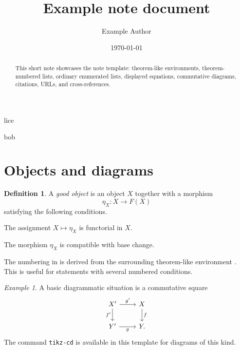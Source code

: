 \documentclass[12pt,a4paper]{amsart}
\title{Example note document}
\author{Example Author}
\date{\today}
\theoremstyle{plain}
\theoremstyle{definition}
\newtheorem{definition}[theorem]{Definition}
\theoremstyle{remark}
\newtheorem{example}[theorem]{Example}
\numberwithin{equation}{section}
\newif\ifshowtodos
\newif\ifshowcomments
\newcommand{\newauthorcomment}[3]{%
    \expandafter\newcommand\csname #1\endcsname[1]{%
        \ifshowcomments
            \noindent{\textcolor{#3}{\textbf{#2:} ##1}}%
        \fi
    }%
}
\begin{document}
\showtodostrue
\showcommentstrue

\newauthorcomment{alice}{Alice}{red}
\newauthorcomment{bob}{Bob}{red}

\begin{abstract}
    This short note showcases the note template: theorem-like environments,
    theorem-numbered lists, ordinary enumerated lists, displayed equations,
    commutative diagrams, citations, URLs, and cross-references.
\end{abstract}

\maketitle

\tableofcontents

\section{Objects and diagrams}

\begin{definition}
    \label{definition:good-object}
    A \emph{good object} is an object \(X\) together with a morphism
    \[
        \eta_X \colon X \to F(X)
    \]
    satisfying the following conditions.
    \begin{theoremitems}
    \item The assignment \(X \mapsto \eta_X\) is functorial in \(X\).
        \label{item:good-functoriality} 
    \item The morphism \(\eta_X\) is compatible with base change.
        \label{item:good-compatibility} 
    \end{theoremitems}
\end{definition}

The numbering in  is
derived from the surrounding theorem-like environment
. This is useful for statements with several
numbered conditions.

\begin{example}
    \label{example:diagram}
    A basic diagrammatic situation is a commutative square
    \[
        \begin{tikzcd}
            X' \arrow[r, "g'"] \arrow[d, "f'"'] & X \arrow[d, "f"] \\
            Y' \arrow[r, "g"']                  & Y .
        \end{tikzcd}
    \]
    The command \texttt{tikz-cd} is available in this template for diagrams of this
    kind.
\end{example}
\end{document}
